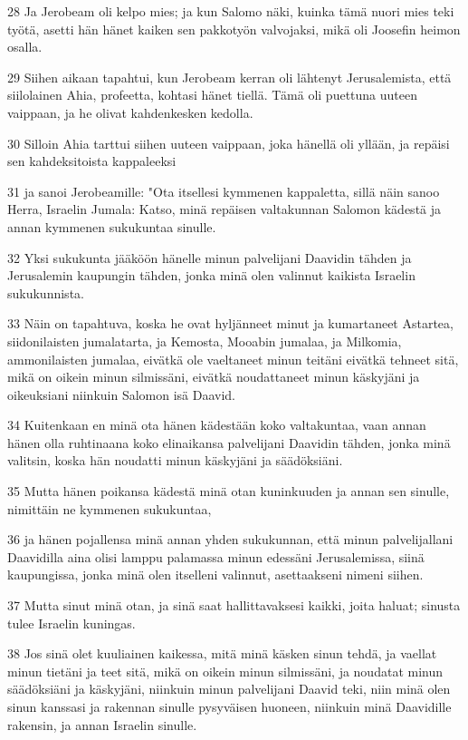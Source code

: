 \par 28 Ja Jerobeam oli kelpo mies; ja kun Salomo näki, kuinka tämä nuori mies teki työtä, asetti hän hänet kaiken sen pakkotyön valvojaksi, mikä oli Joosefin heimon osalla.
\par 29 Siihen aikaan tapahtui, kun Jerobeam kerran oli lähtenyt Jerusalemista, että siilolainen Ahia, profeetta, kohtasi hänet tiellä. Tämä oli puettuna uuteen vaippaan, ja he olivat kahdenkesken kedolla.
\par 30 Silloin Ahia tarttui siihen uuteen vaippaan, joka hänellä oli yllään, ja repäisi sen kahdeksitoista kappaleeksi
\par 31 ja sanoi Jerobeamille: "Ota itsellesi kymmenen kappaletta, sillä näin sanoo Herra, Israelin Jumala: Katso, minä repäisen valtakunnan Salomon kädestä ja annan kymmenen sukukuntaa sinulle.
\par 32 Yksi sukukunta jääköön hänelle minun palvelijani Daavidin tähden ja Jerusalemin kaupungin tähden, jonka minä olen valinnut kaikista Israelin sukukunnista.
\par 33 Näin on tapahtuva, koska he ovat hyljänneet minut ja kumartaneet Astartea, siidonilaisten jumalatarta, ja Kemosta, Mooabin jumalaa, ja Milkomia, ammonilaisten jumalaa, eivätkä ole vaeltaneet minun teitäni eivätkä tehneet sitä, mikä on oikein minun silmissäni, eivätkä noudattaneet minun käskyjäni ja oikeuksiani niinkuin Salomon isä Daavid.
\par 34 Kuitenkaan en minä ota hänen kädestään koko valtakuntaa, vaan annan hänen olla ruhtinaana koko elinaikansa palvelijani Daavidin tähden, jonka minä valitsin, koska hän noudatti minun käskyjäni ja säädöksiäni.
\par 35 Mutta hänen poikansa kädestä minä otan kuninkuuden ja annan sen sinulle, nimittäin ne kymmenen sukukuntaa,
\par 36 ja hänen pojallensa minä annan yhden sukukunnan, että minun palvelijallani Daavidilla aina olisi lamppu palamassa minun edessäni Jerusalemissa, siinä kaupungissa, jonka minä olen itselleni valinnut, asettaakseni nimeni siihen.
\par 37 Mutta sinut minä otan, ja sinä saat hallittavaksesi kaikki, joita haluat; sinusta tulee Israelin kuningas.
\par 38 Jos sinä olet kuuliainen kaikessa, mitä minä käsken sinun tehdä, ja vaellat minun tietäni ja teet sitä, mikä on oikein minun silmissäni, ja noudatat minun säädöksiäni ja käskyjäni, niinkuin minun palvelijani Daavid teki, niin minä olen sinun kanssasi ja rakennan sinulle pysyväisen huoneen, niinkuin minä Daavidille rakensin, ja annan Israelin sinulle.
